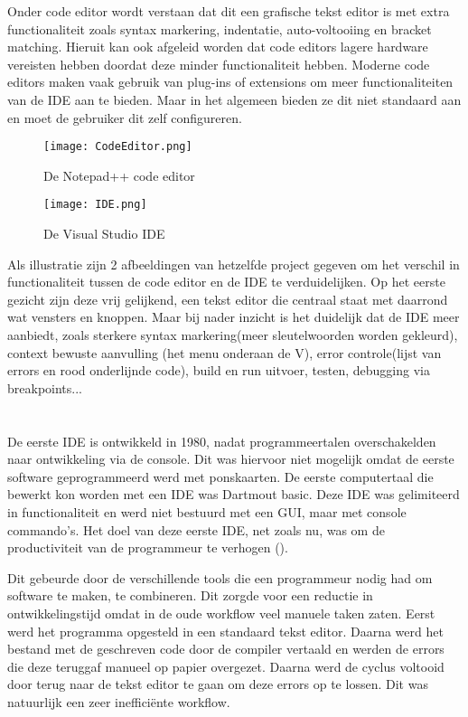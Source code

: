 Onder code editor wordt verstaan dat dit een grafische tekst editor is met extra functionaliteit zoals syntax markering, indentatie, auto-voltooiing en bracket matching. Hieruit kan ook afgeleid worden dat code editors lagere hardware vereisten hebben doordat deze minder functionaliteit hebben. Moderne code editors maken vaak gebruik van plug-ins of extensions om meer functionaliteiten van de IDE aan te bieden. Maar in het algemeen bieden ze dit niet standaard aan en moet de gebruiker dit zelf configureren.

\begin{figure}[h!]
    \texttt{[image: CodeEditor.png]}
    \caption{De Notepad++ code editor}
    \label{fig:codeEditor}
\end{figure}

\begin{figure}[h!]
    \texttt{[image: IDE.png]}
    \caption{De Visual Studio IDE}
    \label{fig:IDE}
\end{figure}

Als illustratie zijn 2 afbeeldingen van hetzelfde project gegeven om het verschil in functionaliteit tussen de code editor en de IDE te verduidelijken. Op het eerste gezicht zijn deze vrij gelijkend, een tekst editor die centraal staat met daarrond wat vensters en knoppen. Maar bij nader inzicht is het duidelijk dat de IDE meer aanbiedt, zoals sterkere syntax markering(meer sleutelwoorden worden gekleurd), context bewuste aanvulling (het menu onderaan de V), error controle(lijst van errors en rood onderlijnde code), build en run uitvoer, testen, debugging via breakpoints...

\section{}
\label{sec:IDE-ontstaan}

De eerste IDE is ontwikkeld in 1980, nadat programmeertalen overschakelden naar ontwikkeling via de console. Dit was hiervoor niet mogelijk omdat de eerste software geprogrammeerd werd met ponskaarten. De eerste computertaal die bewerkt kon worden met een IDE was Dartmout basic. Deze IDE was gelimiteerd in functionaliteit en werd niet bestuurd met een GUI, maar met console commando’s. Het doel van deze eerste IDE, net zoals nu, was om de productiviteit van de programmeur te verhogen (\autocite{JAXenter2018}).

Dit gebeurde door de verschillende tools die een programmeur nodig had om software te maken, te combineren. Dit zorgde voor een reductie in ontwikkelingstijd omdat in de oude workflow veel manuele taken zaten. Eerst werd het programma opgesteld in een standaard tekst editor. Daarna werd het bestand met de geschreven code door de compiler vertaald en werden de errors die deze teruggaf manueel op papier overgezet. Daarna werd de cyclus voltooid door terug naar de tekst editor te gaan om deze errors op te lossen. Dit was natuurlijk een zeer inefficiënte workflow.

